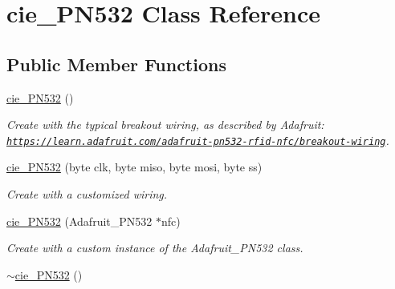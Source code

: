 \hypertarget{classcie__PN532}{}\section{cie\+\_\+\+P\+N532 Class Reference}
\label{classcie__PN532}
\subsection*{Public Member Functions}
\begin{DoxyCompactItemize}
\item 
\hyperlink{classcie__PN532_a598bf209af815df4546e340844a3c659}{cie\+\_\+\+P\+N532} ()\hypertarget{classcie__PN532_a598bf209af815df4546e340844a3c659}{}\label{classcie__PN532_a598bf209af815df4546e340844a3c659}

\begin{DoxyCompactList}\small\item\em Create with the typical breakout wiring, as described by Adafruit\+: \href{https://learn.adafruit.com/adafruit-pn532-rfid-nfc/breakout-wiring}{\tt https\+://learn.\+adafruit.\+com/adafruit-\/pn532-\/rfid-\/nfc/breakout-\/wiring}. \end{DoxyCompactList}\item 
\hyperlink{classcie__PN532_a2b0f7beddebdbebd17d8d0bb39dd8f30}{cie\+\_\+\+P\+N532} (byte clk, byte miso, byte mosi, byte ss)\hypertarget{classcie__PN532_a2b0f7beddebdbebd17d8d0bb39dd8f30}{}\label{classcie__PN532_a2b0f7beddebdbebd17d8d0bb39dd8f30}

\begin{DoxyCompactList}\small\item\em Create with a customized wiring. \end{DoxyCompactList}\item 
\hyperlink{classcie__PN532_ac4533e38683f295bdafdfa89f9bb666b}{cie\+\_\+\+P\+N532} (Adafruit\+\_\+\+P\+N532 $\ast$nfc)\hypertarget{classcie__PN532_ac4533e38683f295bdafdfa89f9bb666b}{}\label{classcie__PN532_ac4533e38683f295bdafdfa89f9bb666b}

\begin{DoxyCompactList}\small\item\em Create with a custom instance of the Adafruit\+\_\+\+P\+N532 class. \end{DoxyCompactList}\item 
\hyperlink{classcie__PN532_a77e9f1e799b717ca7cf9ae92dd908da5}{$\sim$cie\+\_\+\+P\+N532} ()\hypertarget{classcie__PN532_a77e9f1e799b717ca7cf9ae92dd908da5}{}\label{classcie__PN532_a77e9f1e799b717ca7cf9ae92dd908da5}


\end{DoxyCompactItemize}
